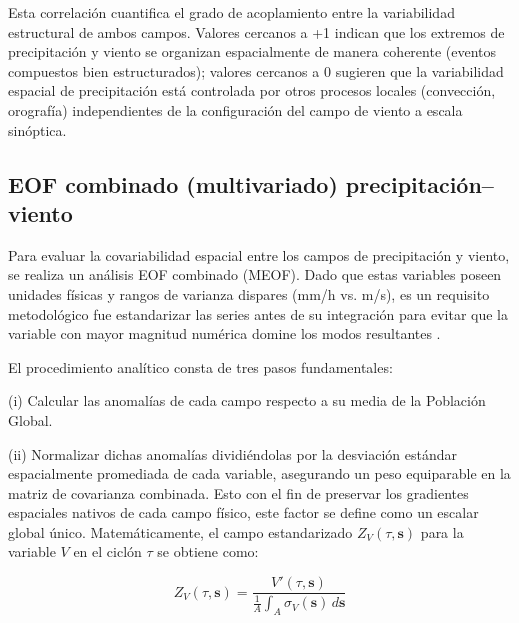 Esta correlación cuantifica el grado de acoplamiento entre la variabilidad estructural de ambos campos. Valores cercanos a +1 indican que los extremos de precipitación y viento se organizan espacialmente de manera coherente (eventos compuestos bien estructurados); valores cercanos a 0 sugieren que la variabilidad espacial de precipitación está controlada por otros procesos locales (convección, orografía) independientes de la configuración del campo de viento a escala sinóptica.


\subsection{EOF combinado (multivariado) precipitación--viento}\label{subsec:eof_multivariado}

Para evaluar la covariabilidad espacial entre los campos de precipitación y viento, se realiza un análisis EOF combinado (MEOF). Dado que estas variables poseen unidades físicas y rangos de varianza dispares (mm/h vs. m/s), es un requisito metodológico fue estandarizar las series antes de su integración para evitar que la variable con mayor magnitud numérica domine los modos resultantes \citep{wilks2019statistical_ch13}. 

El procedimiento analítico consta de tres pasos fundamentales:

(i) Calcular las anomalías de cada campo respecto a su media de la Población Global.

(ii) Normalizar dichas anomalías dividiéndolas por la desviación estándar espacialmente promediada de cada variable, asegurando un peso equiparable en la matriz de covarianza combinada. 
Esto con el fin de preservar los gradientes espaciales nativos de cada campo físico, este factor se define como un escalar global único. 
Matemáticamente, el campo estandarizado $Z_{V}(\tau, \mathbf{s})$ para la variable $V$ en el ciclón $\tau$ se obtiene como:

\begin{equation}
    Z_{V}(\tau, \mathbf{s}) = \frac{V'(\tau, \mathbf{s})}{\frac{1}{A}\int_{A} \sigma_{V}(\mathbf{s}) \, d\mathbf{s}}
\end{equation}

